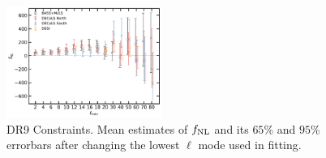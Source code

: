 \begin{figure}
    \centering
    \includegraphics[width=0.45\textwidth]{figures/fnl_elmin.pdf}     
    \caption{DR9 Constraints. Mean estimates of $f_{\rm NL}$ and its $65$\% and $95$\% errorbars after changing the lowest $\ell$ mode used in fitting.}\label{fig:mcmc_dr9elmin}
\end{figure}

